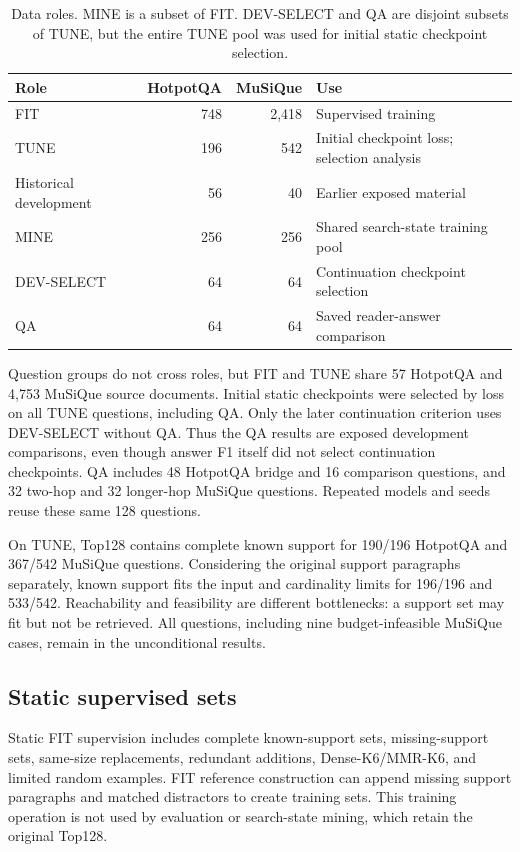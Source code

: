 \documentclass[preprint,12pt]{elsarticle}
\begin{document}
\begin{table}[t]\centering\small
\caption{Data roles. MINE is a subset of FIT. DEV-SELECT and QA are disjoint subsets of TUNE, but the entire TUNE pool was used for initial static checkpoint selection.}\label{tab:roles}
\begin{tabular}{@{}p{2.8cm}rrp{5cm}@{}}\toprule
Role & HotpotQA & MuSiQue & Use\\\midrule
FIT & 748 & 2,418 & Supervised training\\
TUNE & 196 & 542 & Initial checkpoint loss; selection analysis\\
Historical development & 56 & 40 & Earlier exposed material\\
MINE & 256 & 256 & Shared search-state training pool\\
DEV-SELECT & 64 & 64 & Continuation checkpoint selection\\
QA & 64 & 64 & Saved reader-answer comparison\\\bottomrule
\end{tabular}\end{table}

Question groups do not cross roles, but FIT and TUNE share 57 HotpotQA and 4,753 MuSiQue source documents. Initial static checkpoints were selected by loss on all TUNE questions, including QA. Only the later continuation criterion uses DEV-SELECT without QA. Thus the QA results are exposed development comparisons, even though answer F1 itself did not select continuation checkpoints. QA includes 48 HotpotQA bridge and 16 comparison questions, and 32 two-hop and 32 longer-hop MuSiQue questions. Repeated models and seeds reuse these same 128 questions.

On TUNE, Top128 contains complete known support for 190/196 HotpotQA and 367/542 MuSiQue questions. Considering the original support paragraphs separately, known support fits the input and cardinality limits for 196/196 and 533/542. Reachability and feasibility are different bottlenecks: a support set may fit but not be retrieved. All questions, including nine budget-infeasible MuSiQue cases, remain in the unconditional results.

\subsection{Static supervised sets}
Static FIT supervision includes complete known-support sets, missing-support sets, same-size replacements, redundant additions, Dense-K6/MMR-K6, and limited random examples. FIT reference construction can append missing support paragraphs and matched distractors to create training sets. This training operation is not used by evaluation or search-state mining, which retain the original Top128.
\end{document}
